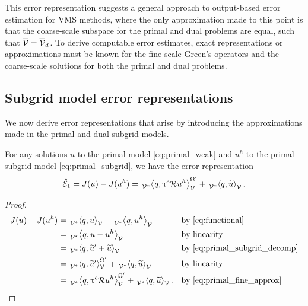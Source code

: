 This error representation suggests a general approach
to output-based error estimation for VMS methods, where
the only approximation made to this point is that the
coarse-scale subspace for the primal and dual problems
are equal, such that $\overline{\mathcal{V}} = \overline{\mathcal{V}}_d$. To derive
computable error estimates, exact representations or
approximations must be known for the fine-scale
Green's operators and the coarse-scale solutions for
both the primal and dual problems.

\subsection{Subgrid model error representations}

We now derive error representations that arise by
introducing the approximations made in the primal
and dual subgrid models.

\begin{prop}
For any solutions $u$ to the primal model \eqref{eq:primal_weak}
and $u^h$ to the primal subgrid model \eqref{eq:primal_subgrid},
we have the error representation
%
\begin{gather}
\hat{\mathcal{E}}_1 = J(u) - J(u^h) =
\,{}_{\mathcal{V}^*}^{}\!\left< {q}, {\uptau^e \mathcal{R} u^h} \right>_{\mathcal{V}}^{\Omega'} + \,{}_{\mathcal{V}^*}^{}\!\left< {q}, {\widetilde{u}} \right>_{\mathcal{V}}.
\label{eq:representation_1}
\end{gather}
%
\end{prop}

\begin{proof}
%
\begin{gather*}
\begin{aligned}
J(u) - J(u^h) &=
\paira{q}{u} - \paira{q}{u^h}
&& \text{by \eqref{eq:functional}} \\
&= \paira{q}{u - u^h}
&& \text{by linearity} \\
&= \paira{q}{\tilde{u}' + \tilde{u}}
&& \text{by \eqref{eq:primal_subgrid_decomp}} \\
&= \paira{q}{\tilde{u}'}^{\Omega'} + \paira{q}{\tilde{u}}
&& \text{by linearity} \\
&= \paira{q}{\uptau^e \R u^h}^{\Omega'} + \paira{q}{\tilde{u}}.
&& \text{by \eqref{eq:primal_fine_approx}} \\
\end{aligned}
\end{gather*}
%
\end{proof}

